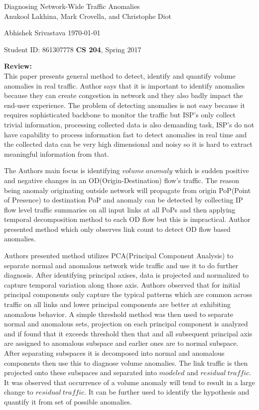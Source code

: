 \documentclass[a4paper,12pt, twoside]{article}
\renewcommand{\maketitle}{%
 	\Large
 	\begin{center}
 	Diagnosing Network-Wide Traffic Anomalies\\	
 	\normalsize Anukool Lakhina, Mark Crovella, and Christophe Diot
 	\end{center}
 
 	\Large
	Abhishek Srivastava
	\hfill
	\normalsize
	\today
 	\par
 	Student ID: 861307778
 	\hfill
 	\textbf{CS 204}, Spring 2017
 	\par 	
 	\hrulefill
 	\par
 	}
\begin{document}
\thispagestyle{empty}
	
\maketitle

\textbf{Review:}\\

This paper presents general method to detect, identify and quantify volume anomalies in real traffic. Author says that it is important to identify anomalies because they can create congestion in network and they also badly impact the end-user experience. The problem of detecting anomalies is not easy because it requires sophisticated backbone to monitor the traffic but ISP's only collect trivial information, processing collected data is also demanding task, ISP's do not have capability to process information fast to detect anomalies in real time and the collected data can be very high dimensional and noisy so it is hard to extract meaningful information from that.

The Authors main focus is identifying $volume~anomaly$ which is sudden positive and negative changes in an OD(Origin-Destination) flow's traffic. The reason being anomaly originating outside network will propagate from origin PoP(Point of Presence) to destination PoP and anomaly can be detected by collecting IP flow level traffic summaries on all input links at all PoPs and then applying temporal decomposition method to each OD flow but this is impractical. Author presented method which only observes link count to detect OD flow based anomalies. 


Authors presented method utilizes PCA(Principal Component Analysis) to separate normal and anomalous network wide traffic and use it to do further diagnosis. After identifying principal axises, data is projected and normalized to capture temporal variation along those axis. Authors observed that for initial principal components only capture the typical patterns which are common across traffic on all links and lower principal components are better at exhibiting anomalous behavior. A simple threshold method was then used to separate normal and anomalous sets, projection on each principal component is analyzed and if found that it exceeds threshold then that and all subsequent principal axis are assigned to anomalous subspace and earlier ones are to normal subspace. After separating subspaces it is decomposed into normal and anomalous components then use this to diagnose volume anomalies. The link traffic is then projected onto these subspaces and separated into $modeled$ and $residual~traffic$. It was observed that  occurrence of a volume anomaly will tend to result in a large change to $residual~traffic$. It can be further used to identify the hypothesis and quantify it from set of possible anomalies.\\
\end{document}
